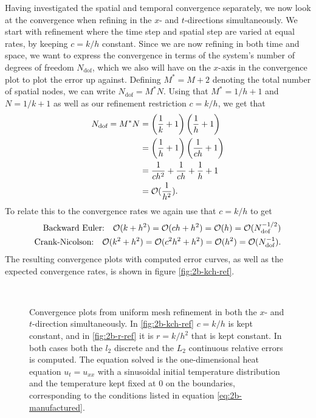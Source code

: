 Having investigated the spatial and temporal convergence separately, 
we now look at the convergence when refining in the $x$- and $t$-directions simultaneously. 
We start with refinement where the time step and spatial step are varied at equal rates, 
by keeping $c = k/h$ constant. 
Since we are now refining in both time and space, 
we want to express the convergence in terms of the system's number of degrees of freedom $N_\text{dof}$, 
which we also will have on the $x$-axis in the convergence plot to plot the error up against. 
Defining $M^* = M+2$ denoting the total number of spatial nodes, 
we can write $N_\text{dof} = M^*N$. 
Using that $M^*=1/h+1$ and $N=1/k+1$ as well as our refinement restriction $c = k/h$, we get that 
\begin{equation*}
\begin{split}
    N_\text{dof} = M^* N & = \left(\frac{1}{k}+1\right)\left(\frac{1}{h}+1\right)
    \\ & = \left(\frac{1}{h}+1\right)\left(\frac{1}{ch}+1\right)
    \\ & = \frac{1}{ch^2} + \frac{1}{ch} + \frac{1}{h} + 1 
    \\ & = \mathcal{O}(\frac{1}{h^2}).
\end{split}
\end{equation*}
To relate this to the convergence rates we again use that $c=k/h$ to get 
\begin{equation*}
\begin{split}
    \text{Backward Euler:} \quad \mathcal{O}(k+h^2) = \mathcal{O}(ch+h^2) = \mathcal{O}(h) = \mathcal{O}(N_\text{dof}^{-1/2})\\
    \text{Crank-Nicolson:} \quad \mathcal{O}(k^2+h^2) = \mathcal{O}(c^2 h^2+h^2) = \mathcal{O}(h^2) = \mathcal{O}(N_\text{dof}^{-1}). 
\end{split}
\end{equation*}
The resulting convergence plots with computed error curves, 
as well as the expected convergence rates,
is shown in figure \ref{fig:2b-kch-ref}. 
\begin{figure}
    \centering
    \subfloat[Convergence plots from uniform refinement with constant $c=k/h$.]{
        
        \label{fig:2b-kch-ref}
    } \\ \medskip
    \subfloat[Convergence plots from uniform refinement with constant $r=k/h^2$.]{
        
        \label{fig:2b-r-ref}
    }
    \caption{
        Convergence plots from uniform mesh refinement in both the $x$- and $t$-direction simultaneously. 
        In \ref{fig:2b-kch-ref} $c=k/h$ is kept constant, 
        and in \ref{fig:2b-r-ref} it is $r=k/h^2$ that is kept constant. 
        In both cases both the $l_2$ discrete and the $L_2$ continuous relative errors is computed. 
        The equation solved is the one-dimensional heat equation $u_t=u_{xx}$ 
        with a sinusoidal initial temperature distribution and the temperature kept fixed at $0$ 
        on the boundaries, 
        corresponding to the conditions listed in equation \eqref{eq:2b-manufactured}. 
    }
    \label{fig:2b-kch-r-ref}
\end{figure}

